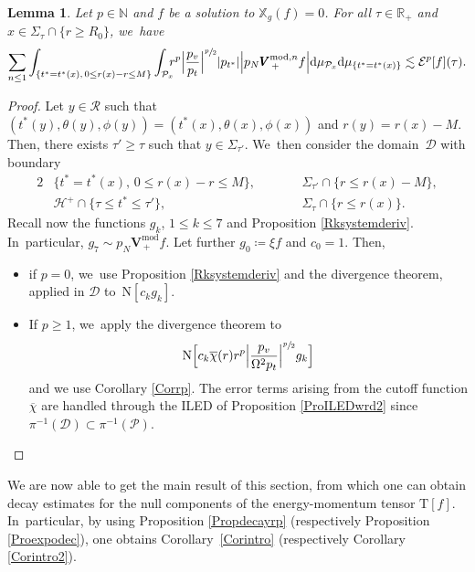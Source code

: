 \documentclass[JEP,XML,SOM,Unicode,published]{cedram}
\theoremstyle{plain}
\newtheorem{lemma}[proposition]{Lemma}
\theoremstyle{definition}
\newcommand\R{{\mathbb{R}}}
\newcommand\T{{\mathbb{X}}}
\newcommand\dr{{\mathrm{d}}}
\begin{document}
\begin{lemma}\label{LemSobVla}
Let $p \in \mathbb{N}$ and $f$ be a solution to $\T_g(f)=0$. For all $\tau \in \R_+$ and $x \in \Sigma_\tau \cap \{ r \geq R_0 \}$, we~have
\[
\sum_{n \leq 1} \int_{\{ t^*=t^*(x), \, 0\leq r(x)-r \leq M \}} \int_{\mathcal{P}_x}\hspace*{-2mm} r^p\Big|\frac{p_v}{p_t}\Big|^{\sfrac{p}{2}} |p_{t^*}| \Big| p_N \pmb{V}_{\, +}^{ \mathrm{mod},n} f \Big| \dr \mu_{\mathcal{P}_x} \dr \mu_{\{ t^*=t^*(x)\} } \lesssim \mathcal{E}^p[f](\tau).
\]
\end{lemma}
\begin{proof}
Let $y \in \mathcal{R}$ such that $(t^*(y),\theta (y), \phi (y))= (t^* (x), \theta (x), \phi (x))$ and $r(y)=r(x)-M$. Then, there exists $\tau' \geq \tau$ such that $y \in \Sigma_{\tau'}$. We~then consider the domain~$\mathcal{D}$ with boundary
\begin{alignat*}{2}
&\{ t^*=t^*(x), \, 0\leq r(x)-r \leq M \},\qquad &&\Sigma_{\tau'} \cap \{ r \leq r(x)-M \}, \\
&\mathcal{H}^+ \cap \{ \tau \leq t^* \leq \tau' \}, \qquad &&\Sigma_\tau \cap \{ r \leq r(x) \}.
\end{alignat*}
Recall now the functions $g_k$, $1 \leq k \leq 7$ and Proposition \ref{Rksystemderiv}. In~particular, $g_7 \sim p_N \pmb{V}_{\, +}^{ \mathrm{mod}} f$. Let further $g_0 \coloneqq \xi f$ and $c_0=1$. Then,
\begin{itemize}
\item if $p=0$, we~use Proposition \ref{Rksystemderiv} and the divergence theorem, applied in $\mathcal{D}$ to~$\mathrm{N}[c_k g_k]$.
\item If $ p \geq 1$, we~apply the divergence theorem to
\[
\mathrm{N}\Bigl[c_k \overline{\chi} (r) r^p \Big|\frac{p_v}{\Omega^2 p_t} \Big|^{\sfrac{p}{2}} g_k\Bigr]
\]
and we use Corollary \ref{Corrp}. The error terms arising from the cutoff function $\overline{\chi}$ are handled through the ILED of Proposition \ref{ProILEDwrd2} since $\pi^{-1}(\mathcal{D}) \subset \pi^{-1}(\mathcal{P})$.\qedhere
\end{itemize}
\end{proof}

We are now able to get the main result of this section, from which one can obtain decay estimates for the null components of the energy-momentum tensor $\mathrm{T}[f]$. In~particular, by using Proposition \ref{Propdecayrp} (respectively Proposition \ref{Proexpodec}), one obtains Corollary~\ref{Corintro} (respectively Corollary \ref{Corintro2}).
\end{document}
